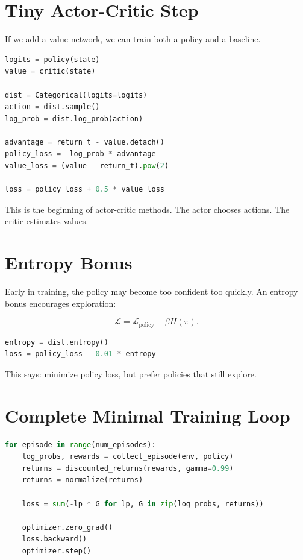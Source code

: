 \documentclass[11pt]{article}
\begin{document}
\section{Tiny Actor-Critic Step}

If we add a value network, we can train both a policy and a baseline.

\begin{lstlisting}[language=Python]
logits = policy(state)
value = critic(state)

dist = Categorical(logits=logits)
action = dist.sample()
log_prob = dist.log_prob(action)

advantage = return_t - value.detach()
policy_loss = -log_prob * advantage
value_loss = (value - return_t).pow(2)

loss = policy_loss + 0.5 * value_loss
\end{lstlisting}

This is the beginning of actor-critic methods.
The actor chooses actions.
The critic estimates values.

\section{Entropy Bonus}

Early in training, the policy may become too confident too quickly.
An entropy bonus encourages exploration:

\[
\mathcal{L}
=
\mathcal{L}_{\text{policy}} - \beta H(\pi).
\]

\begin{lstlisting}[language=Python]
entropy = dist.entropy()
loss = policy_loss - 0.01 * entropy
\end{lstlisting}

This says:
minimize policy loss, but prefer policies that still explore.

\section{Complete Minimal Training Loop}

\begin{lstlisting}[language=Python]
for episode in range(num_episodes):
    log_probs, rewards = collect_episode(env, policy)
    returns = discounted_returns(rewards, gamma=0.99)
    returns = normalize(returns)

    loss = sum(-lp * G for lp, G in zip(log_probs, returns))

    optimizer.zero_grad()
    loss.backward()
    optimizer.step()
\end{lstlisting}
\end{document}
